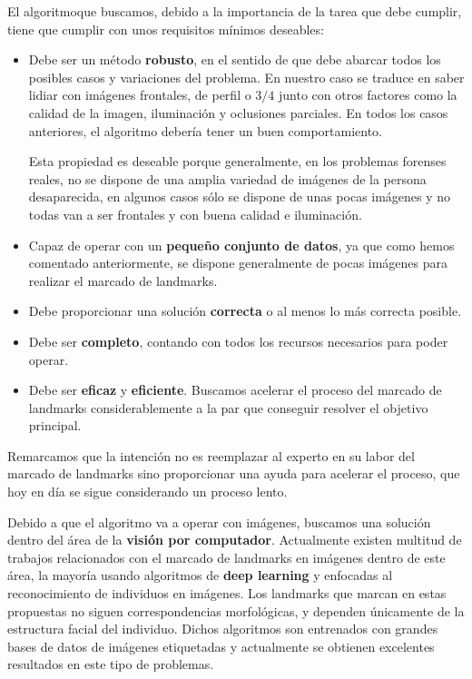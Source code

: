 \medskip

\noindent El algoritmoque buscamos, debido a la importancia de la tarea que debe cumplir, tiene que cumplir con unos requisitos mínimos deseables: 

\begin{itemize}
    \item Debe ser un método \textbf{robusto}, en el sentido de que debe abarcar todos los posibles casos y variaciones del problema. En nuestro caso se traduce en saber lidiar con imágenes frontales, de perfil o $3/4$ junto con otros factores como la calidad de la imagen, iluminación y oclusiones parciales. En todos los casos anteriores, el algoritmo debería tener un buen comportamiento.
    
    \medskip

    \noindent Esta propiedad es deseable porque generalmente, en los problemas forenses reales, no se dispone de una amplia variedad de imágenes de la persona desaparecida, en algunos casos sólo se dispone de unas pocas imágenes y no todas van a ser frontales y con buena calidad e iluminación.

    \item Capaz de operar con un \textbf{pequeño conjunto de datos}, ya que como hemos comentado anteriormente, se dispone generalmente de pocas imágenes para realizar el marcado de landmarks.
    \item Debe proporcionar una solución \textbf{correcta} o al menos lo más correcta posible.  
    \item Debe ser \textbf{completo}, contando con todos los recursos necesarios para poder operar.
    \item Debe ser \textbf{eficaz} y \textbf{eficiente}. Buscamos acelerar el proceso del marcado de landmarks considerablemente a la par que conseguir resolver el objetivo principal.
\end{itemize}

\noindent Remarcamos que la intención no es reemplazar al experto en su labor del marcado de landmarks sino proporcionar una ayuda para acelerar el proceso, que hoy en día se sigue considerando un proceso lento.

\medskip 

\noindent Debido a que el algoritmo va a operar con imágenes, buscamos una solución dentro del área de la \textbf{visión por computador}. Actualmente existen  multitud de trabajos relacionados con el marcado de landmarks en imágenes dentro de este área, la mayoría usando algoritmos de \textbf{deep learning} y enfocadas al reconocimiento de individuos en imágenes. Los landmarks que marcan en estas propuestas no siguen correspondencias morfológicas, y dependen únicamente de la estructura facial del individuo. Dichos algoritmos son entrenados con grandes bases de datos de imágenes etiquetadas y actualmente se obtienen excelentes resultados en este tipo de problemas.


